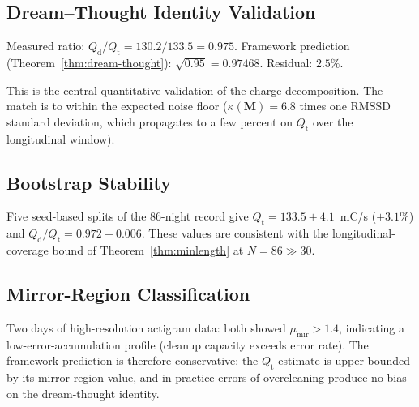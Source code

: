 \documentclass[11pt,twocolumn,a4paper]{article}
\theoremstyle{definition}
\theoremstyle{remark}
\newcommand{\Qt}{Q_{\mathrm{t}}}
\newcommand{\Qd}{Q_{\mathrm{d}}}
\newcommand{\RMSSD}{\mathrm{RMSSD}}
\newcommand{\munir}{\mu_{\mathrm{mir}}}
\begin{document}
\subsection{Dream--Thought Identity Validation}

Measured ratio: $\Qd/\Qt = 130.2/133.5 = 0.975$. Framework prediction
(Theorem~\ref{thm:dream-thought}): $\sqrt{0.95} = 0.97468$. Residual:
$2.5\%$.

This is the central quantitative validation of the charge
decomposition. The match is to within the expected noise floor
($\kappa(\mathbf{M}) = 6.8$ times one $\RMSSD$ standard deviation,
which propagates to a few percent on $\Qt$ over the longitudinal
window).

\subsection{Bootstrap Stability}

Five seed-based splits of the 86-night record give $\Qt = 133.5
\pm 4.1$~mC/s ($\pm 3.1\%$) and $\Qd/\Qt = 0.972 \pm 0.006$. These
values are consistent with the longitudinal-coverage bound of
Theorem~\ref{thm:minlength} at $N = 86 \gg 30$.

\subsection{Mirror-Region Classification}

Two days of high-resolution actigram data: both showed $\munir > 1.4$,
indicating a low-error-accumulation profile (cleanup capacity
exceeds error rate). The framework prediction is therefore conservative:
the $\Qt$ estimate is upper-bounded by its mirror-region value, and
in practice errors of overcleaning produce no bias on the dream-thought
identity.
\end{document}
